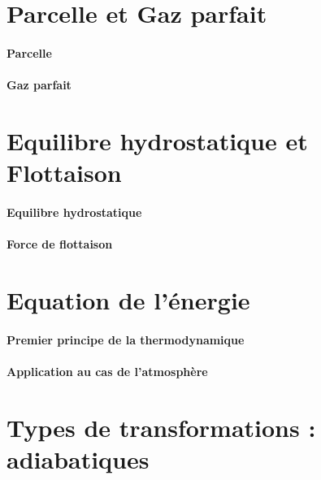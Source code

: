 \documentclass[a4paper,DIV16,10pt]{scrartcl}
\begin{document}
\begin{detail}
\newpage
\section{Parcelle et Gaz parfait}
	\paragraph{Parcelle}
		
		
	\paragraph{Gaz parfait}
		

\newpage
\section{Equilibre hydrostatique et Flottaison}
	\paragraph{Equilibre hydrostatique}
		
	\paragraph{Force de flottaison}
		

\newpage
\section{Equation de l'énergie}
	\paragraph{Premier principe de la thermodynamique}
		
	\paragraph{Application au cas de l'atmosphère}
		
\end{detail}

\newpage
\section{Types de transformations : adiabatiques}

\end{document}
